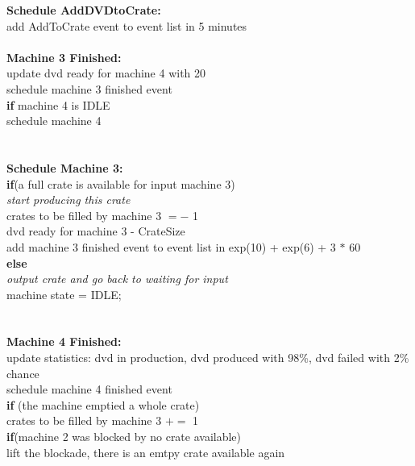 \documentclass[11pt,a4paper]{article}
\newcommand{\tab}{\hspace*{2em}}
\begin{document}
\noindent \textbf{Schedule AddDVDtoCrate:} \textbraceleft\\ 
	\tab add AddToCrate event to event list in 5 minutes \\
\textbraceright \\

\noindent \textbf{Machine 3 Finished:} \textbraceleft\\ 
	\tab update dvd ready for machine 4 with 20 \\
	\tab schedule machine 3 finished event \\
	\tab \textbf{if} machine 4 is IDLE \textbraceleft \\
	\tab \tab schedule machine 4 \\
	\tab \textbraceright \\
\textbraceright \\

\noindent \textbf{Schedule Machine 3:} \textbraceleft\\ 
	\tab \textbf{if}(a full crate is available for input machine 3) \textbraceleft \\
	\tab \tab \emph{start producing this crate} \\
	\tab \tab crates to be filled by machine 3 $=-$ 1 \\
	\tab \tab dvd ready for machine 3 - CrateSize \\
	\tab \tab add machine 3 finished event to event list in exp(10) + exp(6) + 3 $*$ 60 \\
	\tab \textbraceright \textbf{else} \textbraceleft \\
	\tab \tab \emph{output crate and go back to waiting for input} \\
	\tab \tab machine state = IDLE; \\
	\tab \textbraceright \\
\textbraceright \\

\noindent \textbf{Machine 4 Finished:} \textbraceleft\\ 
	\tab update statistics: dvd in production, dvd produced with 98\%, dvd failed with 2\% chance \\
	\tab schedule machine 4 finished event \\
	\tab \textbf{if} (the machine emptied a whole crate) \textbraceleft \\
	\tab \tab crates to be filled by machine 3 $+=$ 1 \\
	\tab \tab \textbf{if}(machine 2 was blocked by no crate available) \textbraceleft \\
	\tab \tab \tab lift the blockade, there is an emtpy crate available again \\
	\tab \tab \textbraceright \\
	\tab \textbraceright \\
\textbraceright \\
\end{document}
